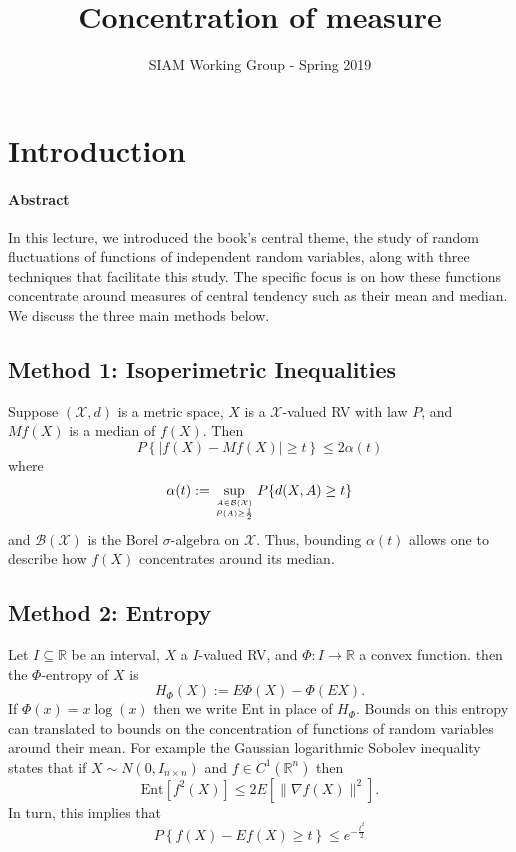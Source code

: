 \documentclass{amsproc}
\title{Concentration of measure}
\author{SIAM Working Group - Spring 2019}
\begin{document}
\maketitle
\tableofcontents


\section{Introduction}
\label{sec:introduction}
	\paragraph{\textbf{Abstract}}
	In this lecture, we introduced the book's central theme, the study of random fluctuations of functions of independent random variables, along with three techniques that facilitate this study. The specific focus is on how these functions concentrate around measures of central tendency such as their mean and median. We discuss the three main methods below.

	\subsection*{Method 1: Isoperimetric Inequalities}

	Suppose $(\mathcal{X},d)$ is a metric space, $X$ is a $\mathcal{X}$-valued RV with law $P$, and $Mf(X)$ is a median of $f(X)$. Then
	\[
		P\left\{|f(X)-Mf(X)|\geq t\right\}\leq 2\alpha(t)
	\]
	where
	\[
		\alpha(t):=\sup_{A\in \mathcal{B}(\mathcal{X})\atop P(A)\geq\frac{1}{2}}P\{d(X,A)\geq t\}
	\]
	and $\mathcal{B}(\mathcal{X})$ is the Borel $\sigma$-algebra on $\mathcal{X}$. Thus, bounding $\alpha(t)$ allows one to describe how $f(X)$ concentrates around its median.

	\subsection*{Method 2: Entropy}

	Let $I\subseteq\mathbb{R}$ be an interval, $X$ a $I$-valued RV, and $\Phi:I\to\mathbb{R}$ a convex function. then the $\Phi$-entropy of $X$ is
	\[
		H_\Phi(X):=E\Phi(X)-\Phi(EX).
	\]
	If $\Phi(x)=x\log(x)$ then we write $\text{Ent}$ in place of $H_\Phi$. Bounds on this entropy can translated to bounds on the concentration of functions of random variables around their mean. For example the Gaussian logarithmic Sobolev inequality states that if $X\sim N(0,I_{n\times n})$ and $f\in C^1(\mathbb{R}^n)$ then
	\[
		\text{Ent}\left[f^2(X)\right]\leq 2E\left[\|\nabla f(X)\|^2\right].
	\]
	In turn, this implies that
	\[
		P\left\{f(X)-Ef(X)\geq t\right\}\leq e^{-\frac{t^2}{2}}
	\]
\end{document}
